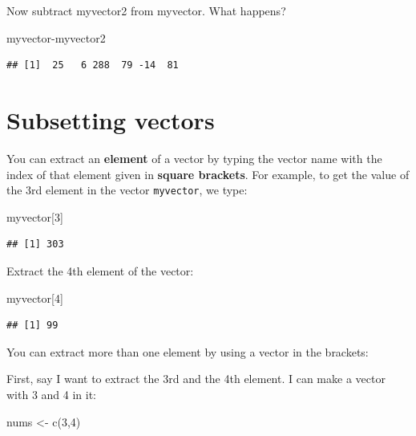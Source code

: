 \documentclass[
]{book}
\newenvironment{Shaded}{\begin{snugshade}}{\end{snugshade}}
\newcommand{\DecValTok}[1]{\textcolor[rgb]{0.00,0.00,0.81}{#1}}
\newcommand{\FunctionTok}[1]{\textcolor[rgb]{0.00,0.00,0.00}{#1}}
\newcommand{\NormalTok}[1]{#1}
\newcommand{\OtherTok}[1]{\textcolor[rgb]{0.56,0.35,0.01}{#1}}
\newcommand{\SpecialCharTok}[1]{\textcolor[rgb]{0.00,0.00,0.00}{#1}}
\begin{document}
Now subtract myvector2 from myvector. What happens?

\begin{Shaded}
\begin{Highlighting}[]
\NormalTok{myvector}\SpecialCharTok{{-}}\NormalTok{myvector2}
\end{Highlighting}
\end{Shaded}

\begin{verbatim}
## [1]  25   6 288  79 -14  81
\end{verbatim}

\hypertarget{subsetting-vectors}{%
\section{Subsetting vectors}\label{subsetting-vectors}}

You can extract an \textbf{element} of a vector by typing the vector name with the index of that element given in \textbf{square brackets}. For example, to get the value of the 3rd element in the vector \texttt{myvector}, we type:

\begin{Shaded}
\begin{Highlighting}[]
\NormalTok{myvector[}\DecValTok{3}\NormalTok{]}
\end{Highlighting}
\end{Shaded}

\begin{verbatim}
## [1] 303
\end{verbatim}

Extract the 4th element of the vector:

\begin{Shaded}
\begin{Highlighting}[]
\NormalTok{myvector[}\DecValTok{4}\NormalTok{]}
\end{Highlighting}
\end{Shaded}

\begin{verbatim}
## [1] 99
\end{verbatim}

You can extract more than one element by using a vector in the brackets:

First, say I want to extract the 3rd and the 4th element. I can make a vector with 3 and 4 in it:

\begin{Shaded}
\begin{Highlighting}[]
\NormalTok{nums }\OtherTok{\textless{}{-}} \FunctionTok{c}\NormalTok{(}\DecValTok{3}\NormalTok{,}\DecValTok{4}\NormalTok{)}
\end{Highlighting}
\end{Shaded}
\end{document}
